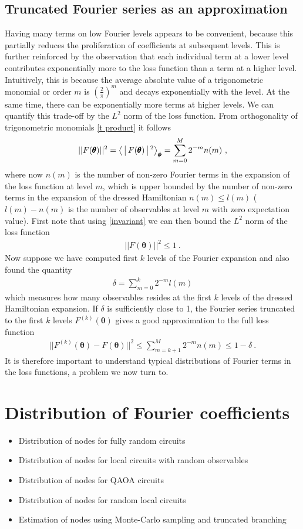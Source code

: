 \documentclass[twocolumn, amsfonts, amssymb, aps, nofootinbib]{revtex4-2}
\begin{document}
\subsection{Truncated Fourier series as an approximation}
Having many terms on low Fourier levels appears to be convenient, because this partially reduces the proliferation of coefficients at subsequent levels. This is further reinforced by the observation that each individual term at a lower level contributes exponentially more to the loss function than a term at a higher level. Intuitively, this is because the average absolute value of a trigonometric monomial or order $m$ is $\left(\frac{2}{\pi}\right)^{m}$ and decays exponentially with the level. At the same time, there can be exponentially more terms at higher levels. We can quantify this trade-off by the $L^2$ norm of the loss function. From orthogonality of trigonometric monomials \eqref{t product} it follows
\begin{align}
	||F(\pmb\theta)||^2=\Braket{|F(\pmb\theta)|^2}_{\pmb\phi}=\sum_{m=0}^M 2^{-m}n(m) \ ,
\end{align}
where now $n(m)$ is the number of non-zero Fourier terms in the expansion of the loss function at level $m$, which is upper bounded by the number of non-zero terms in the expansion of the dressed Hamiltonian $n(m)\le l(m)$ ($l(m)-n(m)$ is the number of observables at level $m$ with zero expectation value). First note that using \eqref{invariant} we can then bound the $L^2$ norm of the loss function
\begin{align}
	||F(\pmb\theta)||^2\le 1 \ .
\end{align}
Now suppose we have computed first $k$ levels of the Fourier expansion and also found the quantity
\begin{align}
	\delta=\sum_{m=0}^k 2^{-m}l(m)
\end{align}
which measures how many observables resides at the first $k$ levels of the dressed Hamiltonian expansion. If $\delta$ is sufficiently close to 1, the Fourier series truncated to the first $k$ levels $F^{(k)}(\pmb\theta)$ gives a good approximation to the full loss function
\begin{align}
	||F^{(k)}(\pmb\theta)-F(\pmb\theta)||^2\le \sum_{m=k+1}^M 2^{-m}n(m)\le 1-\delta \ . \label{delta}
\end{align}
It is therefore important to understand typical distributions of Fourier terms in the loss functions, a problem we now turn to.

\section{Distribution of Fourier coefficients}
\begin{itemize}
	\item Distribution of nodes for fully random circuits
	\item Distribution of nodes for local circuits with random observables
	\item Distribution of nodes for QAOA circuits
	\item Distribution of nodes for random local circuits
	\item Estimation of nodes using Monte-Carlo sampling and truncated branching
\end{itemize}
\end{document}
